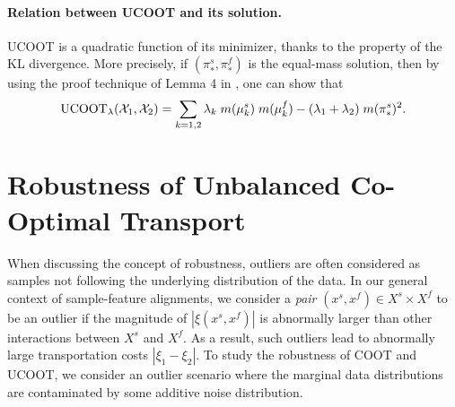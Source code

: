 \paragraph{Relation between UCOOT and its solution.}
UCOOT is a quadratic function of its minimizer, thanks to the property of the
KL divergence. More precisely, if $(\pi_*^s, \pi_*^f)$ is the equal-mass solution,
then by using the proof technique of Lemma 4 in \citep{Khiem20}, one can show that
\begin{align}
  \label{eq:ucoot_minimizer_minimum}
  \text{UCOOT}_{\lambda}(\mathcal X_1, \mathcal X_2) =
  \sum_{k=1, 2} \lambda_k \; m(\mu_k^s) \; m(\mu_k^f) - (\lambda_1  + \lambda_2) \; m(\pi^s_*)^2.
\end{align}

\section{Robustness of Unbalanced Co-Optimal Transport} \label{sec:robustness}
When discussing the concept of robustness, outliers are often considered as samples
not following the underlying distribution of the data. In our general context of
sample-feature alignments, we consider a \emph{pair} $(x^s, x^f) \in X^s \times X^f$
to be an outlier if the magnitude of $|\xi(x^s, x^f)|$ is abnormally larger than
other interactions between $X^s$ and $X^f$. As a result, such outliers lead to
abnormally large transportation costs $|\xi_1 - \xi_2|$. To study the robustness of COOT and UCOOT,
we consider an outlier scenario where the marginal data distributions are contaminated
by some additive noise distribution.
